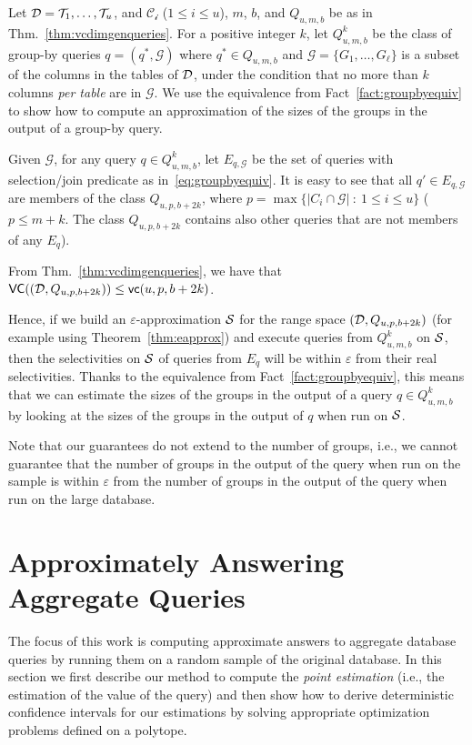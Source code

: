 Let ${\cal D}={{\cal T}_1,\dots,{\cal T}_u}$, and $\mathcal{C_i}$ ($1\le i \le u$), $m$, $b$,
and $Q_{u,m,b}$ be as in Thm.~\ref{thm:vcdimgenqueries}. For a positive integer
$k$, let $Q^k_{u,m,b}$ be the class of group-by queries $q=(q^*,\mathcal{G})$
where $q^*\in Q_{u,m,b}$ and $\mathcal{G}=\{G_1,\dots,G_\ell\}$ is a subset of
the columns in the tables of ${\cal D}$, under the condition that no more than $k$
columns \emph{per table} are in $\mathcal{G}$. We use the equivalence from
Fact~\ref{fact:groupbyequiv} to show how to compute an approximation of the
sizes of the groups in the output of a group-by query. 

Given $\mathcal{G}$, for any query $q\in Q^k_{u,m,b}$, let $E_{q,\mathcal{G}}$
be the set of queries with selection/join predicate as
in~\eqref{eq:groupbyequiv}. It is easy to see that all $q'\in E_{q,\mathcal{G}}$
are members of the class $Q_{u,p,b+2k}$, where $p=\max\{|C_i\cap\mathcal{G}|
~:~ 1\le i\le u\}$ ($p\le m+k$. The class $Q_{u,p,b+2k}$ contains also other
queries that are not members of any $E_q$). 
\begin{fact}
From Thm.~\ref{thm:vcdimgenqueries}, we have that $\mathsf{VC}(({\cal D},Q_{u,p,b+2k}))\le\mathsf{vc}(u,p,b+2k)$.
\end{fact}

Hence, if we build an $\varepsilon$-approximation ${\cal S}$ for the range space
$({\cal D},Q_{u,p,b+2k})$ (for example using Theorem~\ref{thm:eapprox}) and execute
queries from $Q^k_{u,m,b}$ on ${\cal S}$, then the selectivities on ${\cal S}$ of queries
from $E_q$ will be within $\varepsilon$ from their real selectivities. Thanks to
the equivalence from Fact~\ref{fact:groupbyequiv}, this means that we can
estimate the sizes of the groups in the output of a query $q\in Q^k_{u,m,b}$ by
looking at the sizes of the groups in the output of $q$ when run on ${\cal S}$.


Note that our guarantees do not extend to the number of groups, i.e., we cannot
guarantee that the number of groups in the output of the query when run on the
sample is within $\varepsilon$ from the number of groups in the output of the
query when run on the large database.


\section{Approximately Answering Aggregate Queries}\label{sec:aggreg}
The focus of this work is computing approximate answers to aggregate database
queries by running them on a random sample of the original database. In this
section we first describe our method to compute the \emph{point estimation}
(i.e., the estimation of the value of the query) and then show how to derive
deterministic confidence intervals for our estimations by solving appropriate
optimization problems defined on a polytope.

